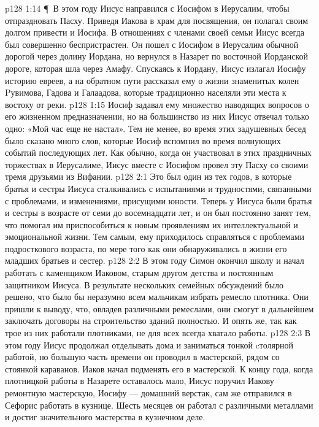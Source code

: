 \vs p128 1:14 \P\ В этом году Иисус направился с Иосифом в Иерусалим, чтобы отпраздновать Пасху. Приведя Иакова в храм для посвящения, он полагал своим долгом привести и Иосифа. В отношениях с членами своей семьи Иисус всегда был совершенно беспристрастен. Он пошел с Иосифом в Иерусалим обычной дорогой через долину Иордана, но вернулся в Назарет по восточной Иорданской дороге, которая шла через Aмафу. Спускаясь к Иордану, Иисус излагал Иосифу историю евреев, а на обратном пути рассказал ему о жизни знаменитых колен Pувимова, Гадова и Галаадова, которые традиционно населяли эти места к востоку от реки.
\vs p128 1:15 Иосиф задавал ему множество наводящих вопросов о его жизненном предназначении, но на большинство из них Иисус отвечал только одно: «Мой час еще не настал». Тем не менее, во время этих задушевных бесед было сказано много слов, которые Иосиф вспомнил во время волнующих событий последующих лет. Как обычно, когда он участвовал в этих праздничных торжествах в Иерусалиме, Иисус вместе с Иосифом провел эту Пасху со своими тремя друзьями из Вифании.
\vs p128 2:1 Это был один из тех годов, в которые братья и сестры Иисуса сталкивались с испытаниями и трудностями, связанными с проблемами, и изменениями, присущими юности. Теперь у Иисуса были братья и сестры в возрасте от семи до восемнадцати лет, и он был постоянно занят тем, что помогал им приспособиться к новым проявлениям их интеллектуальной и эмоциональной жизни. Тем самым, ему приходилось справляться с проблемами подросткового возраста, по мере того как они обнаруживались в жизни его младших братьев и сестер.
\vs p128 2:2 В этом году Симон окончил школу и начал работать с каменщиком Иаковом, старым другом детства и постоянным защитником Иисуса. В результате нескольких семейных обсуждений было решено, что было бы неразумно всем мальчикам избрать ремесло плотника. Они пришли к выводу, что, овладев различными ремеслами, они смогут в дальнейшем заключать договоры на строительство зданий полностью. И опять же, так как трое из них работали плотниками, не для всех всегда хватало работы.
\vs p128 2:3 В этом году Иисус продолжал отделывать дома и заниматься тонкой cтолярной работой, но большую часть времени он проводил в мастерской, рядом со стоянкой караванов. Иаков начал подменять его в мастерской. К концу года, когда плотницкой работы в Назарете оставалось мало, Иисус поручил Иакову ремонтную мастерскую, Иосифу --- домашний верстак, сам же отправился в Сефорис работать в кузнице. Шесть месяцев он работал с различными металлами и достиг значительного мастерства в кузнечном деле.
